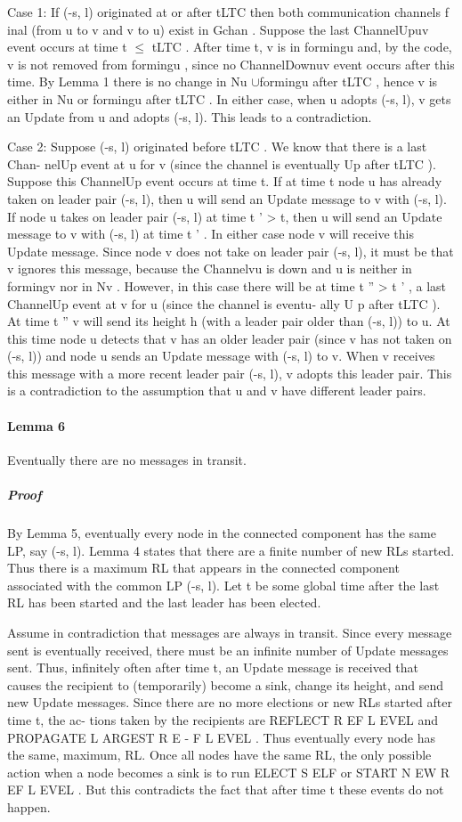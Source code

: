 Case 1: If (-s, l) originated at or after tLTC then both communication channels f inal (from u to v and v to u) exist in Gchan . Suppose the last ChannelUpuv event occurs at time t $\leq$ tLTC . After time t, v is in formingu and, by the code, v is not removed from formingu , since no ChannelDownuv event occurs after this time. By Lemma 1 there is no change in Nu $\cup$formingu after tLTC , hence v is either in Nu or formingu after tLTC . In either case, when u adopts (-s, l), v gets an Update from u and adopts (-s, l). This leads to a contradiction.

Case 2: Suppose (-s, l) originated before tLTC . We know that there is a last Chan- nelUp event at u for v (since the channel is eventually Up after tLTC ). Suppose this ChannelUp event occurs at time t. If at time t node u has already taken on leader pair (-s, l), then u will send an Update message to v with (-s, l). If node u takes on leader pair (-s, l) at time t ' > t, then u will send an Update message to v with (-s, l) at time t ' . In either case node v will receive this Update message. Since node v does not take on leader pair (-s, l), it must be that v ignores this message, because the Channelvu is down and u is neither in formingv nor in Nv . However, in this case there will be at time t '' > t ' , a last ChannelUp event at v for u (since the channel is eventu- ally U p after tLTC ). At time t '' v will send its height h (with a leader pair older than (-s, l)) to u. At this time node u detects that v has an older leader pair (since v has not taken on (-s, l)) and node u sends an Update message with (-s, l) to v. When v receives this message with a more recent leader pair (-s, l), v adopts this leader pair. This is a contradiction to the assumption that u and v have different leader pairs.
\paragraph{Lemma 6}Eventually there are no messages in transit.
\subparagraph{Proof}By Lemma 5, eventually every node in the connected component has the same LP, say (-s, l). Lemma 4 states that there are a finite number of new RLs started. Thus there is a maximum RL that appears in the connected component associated with the common LP (-s, l). Let t be some global time after the last RL has been started and the last leader has been elected.

Assume in contradiction that messages are always in transit. Since every message sent is eventually received, there must be an infinite number of Update messages sent. Thus, infinitely often after time t, an Update message is received that causes the recipient to (temporarily) become a sink, change its height, and send new Update messages. Since there are no more elections or new RLs started after time t, the ac- tions taken by the recipients are REFLECT R EF L EVEL and PROPAGATE L ARGEST R E - F L EVEL . Thus eventually every node has the same, maximum, RL. Once all nodes have the same RL, the only possible action when a node becomes a sink is to run ELECT S ELF or START N EW R EF L EVEL . But this contradicts the fact that after time t these events do not happen.

